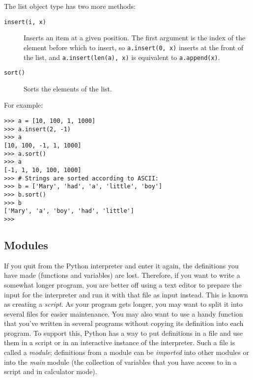 The list object type has two more methods:
\begin{description}
\item[{\tt insert(i, x)}]
Inserts an item at a given position.
The first argument is the index of the element before which to insert,
so {\tt a.insert(0, x)} inserts at the front of the list, and
{\tt a.insert(len(a), x)} is equivalent to {\tt a.append(x)}.
\item[{\tt sort()}]
Sorts the elements of the list.
\end{description}
For example:
\bcode\begin{verbatim}
>>> a = [10, 100, 1, 1000]
>>> a.insert(2, -1)
>>> a
[10, 100, -1, 1, 1000]
>>> a.sort()
>>> a
[-1, 1, 10, 100, 1000]
>>> # Strings are sorted according to ASCII:
>>> b = ['Mary', 'had', 'a', 'little', 'boy']
>>> b.sort()
>>> b
['Mary', 'a', 'boy', 'had', 'little']
>>> 
\end{verbatim}\ecode

\subsection{Modules}

If you quit from the Python interpreter and enter it again, the
definitions you have made (functions and variables) are lost.
Therefore, if you want to write a somewhat longer program, you are
better off using a text editor to prepare the input for the interpreter
and run it with that file as input instead.
This is known as creating a
{\em script}.
As your program gets longer, you may want to split it into several files
for easier maintenance.
You may also want to use a handy function that you've written in several
programs without copying its definition into each program.
To support this, Python has a way to put definitions in a file and use
them in a script or in an interactive instance of the interpreter.
Such a file is called a
{\em module};
definitions from a module can be
{\em imported}
into other modules or into the
{\em main}
module (the collection of variables that you have access to in
a script and in calculator mode).

